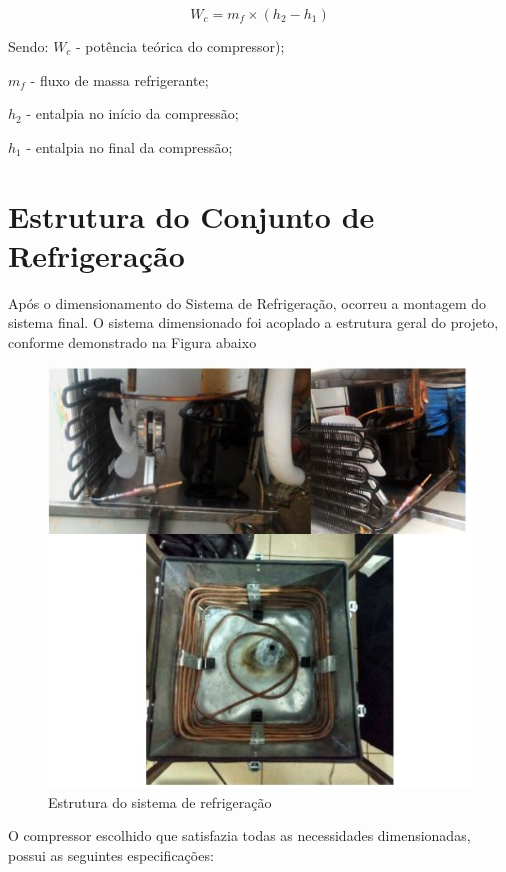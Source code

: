 	 \begin{equation}
	 W_c = m_f \times (h_2 - h_1)
	 \end{equation}
	 
	 Sendo:
	$ W_c$ -  potência teórica do compressor); 
	
	 $m_f$ - fluxo de massa refrigerante;
	 
	 $h_2$ -  entalpia no início da compressão;
	 
	 $h_1$ - entalpia no final da compressão;
	 
	 \section{Estrutura do Conjunto de Refrigeração}
	 Após o dimensionamento do Sistema de Refrigeração, ocorreu a montagem do sistema final. O sistema dimensionado foi acoplado a estrutura geral do projeto, conforme demonstrado na Figura abaixo
	 	\begin{figure}[H]
	 		\begin{center}
	 			\includegraphics[scale =1]{figuras/Estrutura_refrigeracao}
	 			\caption{Estrutura do sistema de refrigeração }
	 		\end{center}
	 	\end{figure}
	 O compressor escolhido que satisfazia todas as necessidades dimensionadas, possui as seguintes especificações:
	 
